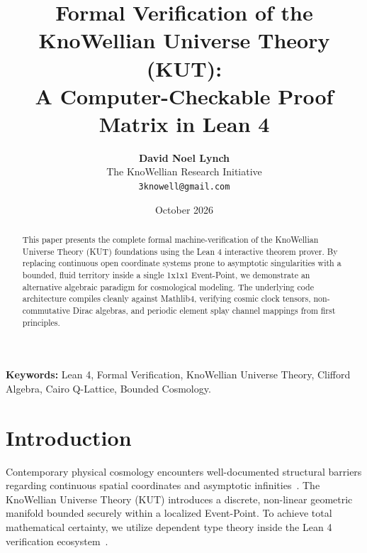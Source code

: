 \documentclass[11pt, memorandum, twoside]{article}
\title{\textbf{Formal Verification of the KnoWellian Universe Theory (KUT):\\ A Computer-Checkable Proof Matrix in Lean 4}}
\author{\textbf{David Noel Lynch} \\ \small The KnoWellian Research Initiative \\ \small \texttt{3knowell@gmail.com}}
\date{\small October 2026}
\begin{document}
\maketitle

\begin{abstract}
This paper presents the complete formal machine-verification of the KnoWellian Universe Theory (KUT) foundations using the Lean 4 interactive theorem prover. By replacing continuous open coordinate systems prone to asymptotic singularities with a bounded, fluid territory inside a single 1x1x1 Event-Point, we demonstrate an alternative algebraic paradigm for cosmological modeling. The underlying code architecture compiles cleanly against Mathlib4, verifying cosmic clock tensors, non-commutative Dirac algebras, and periodic element splay channel mappings from first principles.
\end{abstract}

\textbf{Keywords:} Lean 4, Formal Verification, KnoWellian Universe Theory, Clifford Algebra, Cairo Q-Lattice, Bounded Cosmology.

\section{Introduction}
Contemporary physical cosmology encounters well-documented structural barriers regarding continuous spatial coordinates and asymptotic infinities~\cite{lynch2026topological}. The KnoWellian Universe Theory (KUT) introduces a discrete, non-linear geometric manifold bounded securely within a localized Event-Point. To achieve total mathematical certainty, we utilize dependent type theory inside the Lean 4 verification ecosystem~\cite{moura2021lean}.
\end{document}
